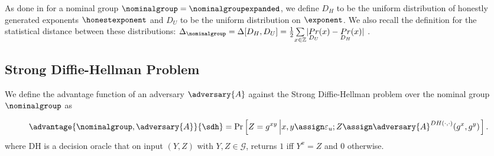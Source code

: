         As done in \cite{EC:ABHKLR21} for a nominal group $\nominalgroup = \nominalgroupexpanded$, we define $D_H$ to be the uniform distribution of honestly generated exponents $\honestexponent$ and $D_U$ to be the uniform distribution on $\exponent$.
        We also recall the definition for the statistical distance between these distributions: $\Delta_{\nominalgroup} = \Delta [ D_H, D_U ] = \frac{1}{2} \underset{x \in \mathbb{Z}}{\sum} | \underset{D_U}{Pr}(x) - \underset{D_H}{Pr}(x) | $ \cite{EC:ABHKLR21}.

        \subsection{Strong Diffie-Hellman Problem}
        \label{sec:strong-dh}

        \begin{definition}
            We define the advantage function of an adversary $\adversary{A}$ against the Strong Diffie-Hellman problem over the nominal group $\nominalgroup$ as

            \[
                \advantage{\nominalgroup, \adversary{A}}{\sdh} = \Pr \left [Z = g^{xy} \left | x,y \assign \varepsilon_u; Z \assign \adversary{A}^{DH(\cdot, \cdot)}(g^x, g^y) \right. \right].
            \]
            where DH is a decision oracle that on input $(Y, Z)$ with $Y, Z \in \mathcal{G}$, returns $1$ iff $Y^x = Z$ and $0$ otherwise.
        \end{definition}
